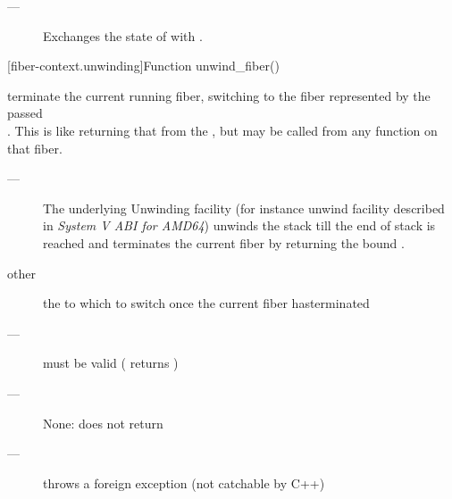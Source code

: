
\effects
\begin{description}
    \item[---] Exchanges the state of  with .
\end{description}

[fiber-context.unwinding]{Function unwind\_fiber()}


\effects
terminate the current running fiber, switching to the fiber represented by
the passed\\\fiber. This is like returning that \fiber from the \entryfn, but
may be called from any function on that fiber.

\remarks
\begin{description}
    \item[---] The underlying Unwinding facility (for instance unwind facility
               described in \emph{System V ABI for AMD64}) unwinds the stack
               till the end of stack is reached and terminates the current fiber
               by returning the bound \fiber.
\end{description}

\params
\begin{description}
    \item[other] the \fiber to which to switch once the current fiber hasterminated
\end{description}

\requires
\begin{description}
    \item[---]  must be valid ( returns )
\end{description}

\returns
\begin{description}
    \item[---] None: \unwindfib does not return
\end{description}

\except
\begin{description}
    \item[---] throws a foreign exception (not catchable by C++)
\end{description}
